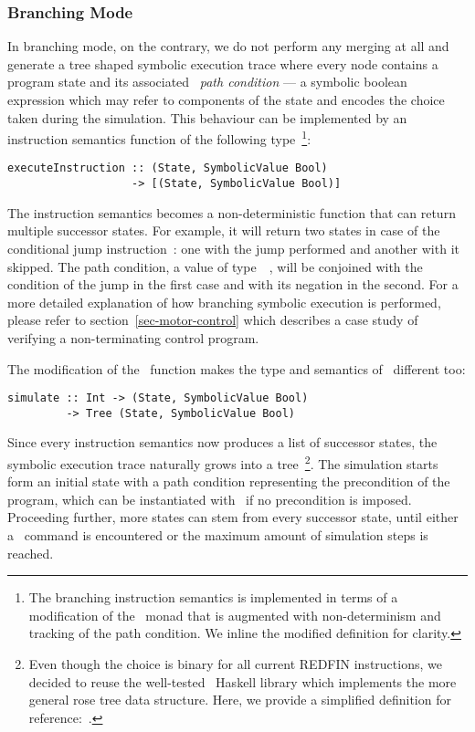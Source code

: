 \subsubsection{Branching Mode}

In branching mode, on the contrary, we do not perform any merging at all and
generate a tree shaped symbolic
execution trace where every node contains a program state
and its associated ~\emph{path condition} --- a symbolic boolean expression which may
refer to components of the state and encodes the choice taken during the simulation. This
behaviour can be implemented by an instruction semantics function of the following
type~\footnote{The branching instruction semantics is implemented in terms of a modification
of the~ monad that is augmented with non-determinism and tracking of the
path condition. We inline the modified definition for clarity.}:

\begin{verbatim}
executeInstruction :: (State, SymbolicValue Bool)
                   -> [(State, SymbolicValue Bool)]
\end{verbatim}

\noindent
The instruction semantics becomes a non-deterministic function that can return multiple
successor states. For example, it will return two states in
case of the conditional jump instruction~: one with the jump performed
and another with it skipped. The path condition,
a value of type~~,
will be conjoined with the condition of the jump in the first case and with its negation
in the second. For a more detailed explanation of how branching
symbolic execution is performed, please refer to section~\ref{sec-motor-control}
which describes a case study of verifying a non-terminating control program.

The modification of the~ function makes the type and semantics
of~ different too:
\begin{verbatim}
simulate :: Int -> (State, SymbolicValue Bool)
         -> Tree (State, SymbolicValue Bool)
\end{verbatim}
Since every instruction semantics now produces a list of successor states, the symbolic
execution trace naturally grows into a tree~\footnote{Even though the choice is binary for
all current REDFIN instructions, we decided to reuse the well-tested~
Haskell library which implements the more general rose tree data structure. Here, we provide
a simplified definition for reference:~.}.
The simulation starts form an initial state with a path condition representing the
precondition of the program, which can be instantiated with~ if no
precondition is imposed. Proceeding further, more states can stem from every successor
state, until either a~ command is encountered or the maximum amount of simulation
steps is reached.

